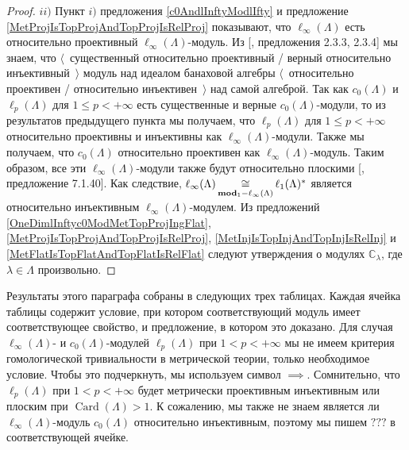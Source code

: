\begin{proof}
$ii)$ Пункт $i)$ предложения \ref{c0AndlInftyModlIfty} и предложение \ref{MetProjIsTopProjAndTopProjIsRelProj} показывают, что $\ell_\infty(\Lambda)$ есть относительно проективный $\ell_\infty(\Lambda)$-модуль. Из [\cite{RamsHomPropSemgroupAlg}, предложения 2.3.3, 2.3.4] мы знаем, что $\langle$~существенный относительно проективный / верный относительно инъективный~$\rangle$ модуль над идеалом банаховой алгебры $\langle$~относительно проективен / относительно инъективен~$\rangle$ над самой алгеброй. Так как $c_0(\Lambda)$ и $\ell_p(\Lambda)$ для $1\leq p<+\infty$ есть существенные и верные $c_0(\Lambda)$-модули, то из результатов предыдущего пункта мы получаем, что $\ell_p(\Lambda)$ для $1\leq p<+\infty$ относительно проективны и инъективны как $\ell_\infty(\Lambda)$-модули. Также мы получаем, что $c_0(\Lambda)$ относительно проективен как $\ell_\infty(\Lambda)$-модуль. Таким образом, все эти $\ell_\infty(\Lambda)$-модули также будут относительно плоскими [\cite{HelBanLocConvAlg}, предложение 7.1.40]. Как следствие, $\ell_\infty(\Lambda)\mathop{\mathbin{\cong}}\limits_{\mathbf{mod}_1-\ell_\infty(\Lambda)}\ell_1(\Lambda)^*$ является относительно инъективным $\ell_\infty(\Lambda)$-модулем. Из предложений \ref{OneDimlInftyc0ModMetTopProjIngFlat}, \ref{MetProjIsTopProjAndTopProjIsRelProj}, \ref{MetInjIsTopInjAndTopInjIsRelInj} и \ref{MetFlatIsTopFlatAndTopFlatIsRelFlat} следуют утверждения о модулях $\mathbb{C}_\lambda$,  где $\lambda\in\Lambda$ произвольно.
\end{proof}

Результаты этого параграфа собраны в следующих трех таблицах. Каждая ячейка таблицы содержит условие, при котором соответствующий модуль имеет соответствующее свойство, и предложение, в котором это доказано. Для случая  $\ell_\infty(\Lambda)$- и $c_0(\Lambda)$-модулей $\ell_p(\Lambda)$ при $1<p<+\infty$ мы не имеем критерия гомологической тривиальности в метрической теории, только необходимое условие. Чтобы это подчеркнуть, мы используем символ $\implies$. Сомнительно, что $\ell_p(\Lambda)$ при $1<p<+\infty$ будет метрически проективным инъективным или плоским при $\operatorname{Card}(\Lambda)>1$. К сожалению, мы также не знаем является ли $\ell_\infty(\Lambda)$-модуль $c_0(\Lambda)$ относительно инъективным, поэтому мы пишем $???$ в соответствующей ячейке. 

